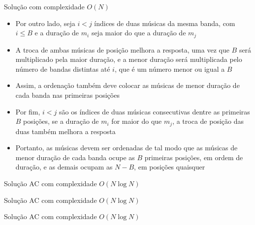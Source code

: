 \begin{frame}[fragile]{Solução com complexidade $O(N)$}

    \begin{itemize}
        \item Por outro lado, seja $i < j$ índices de duas músicas da mesma banda, com
            $i \leq B$ e a duração de $m_i$ seja maior do que a duração de $m_j$

        \item A troca de ambas músicas de posição melhora a resposta, uma vez que $B$ será
            multiplicado pela maior duração, e a menor duração será multiplicada pelo número de
            bandas distintas até $i$, que é um número menor ou igual a $B$

        \item Assim, a ordenação também deve colocar as músicas de menor duração de cada banda
            nas primeiras posições

        \item Por fim, $i < j$ são os índices de duas músicas consecutivas dentre as primeiras 
            $B$ posições, se a duração de $m_i$ for maior do que $m_j$, a troca de posição das
            duas também melhora a resposta

        \item Portanto, as músicas devem ser ordenadas de tal modo que as músicas de menor duração
            de cada banda ocupe as $B$ primeiras posições, em ordem de duração, e as demais
            ocupam as $N - B$, em posições quaisquer
    \end{itemize}

\end{frame}

\begin{frame}[fragile]{Solução AC com complexidade $O(N\log N)$}
\end{frame}

\begin{frame}[fragile]{Solução AC com complexidade $O(N\log N)$}
\end{frame}

\begin{frame}[fragile]{Solução AC com complexidade $O(N\log N)$}
\end{frame}
